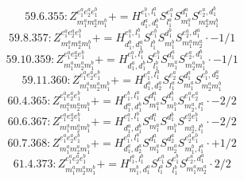 \documentclass[letterpaper,10pt,fleqn,leqno,onecolumn]{article}
\begin{document}
\begin{equation} \;\;\;\;\;\;  59.6.355: Z^{e_{1}^{a}e_{2}^{a}e_{1}^{b}}_{m_{1}^{a}m_{2}^{a}m_{1}^{b}}+=H^{e_{1}^{b},l_{1}^{a}}_{d_{1}^{a},d_{1}^{b}}S^{e_{1}^{a}}_{l_{1}^{a}}S^{d_{1}^{a}}_{m_{1}^{a}}S^{e_{2}^{a},d_{1}^{b}}_{m_{2}^{a}m_{1}^{b}} \end{equation}
\begin{equation} \;\;\;\;\;\;  59.8.357: Z^{e_{1}^{a}e_{2}^{a}e_{1}^{b}}_{m_{1}^{a}m_{2}^{a}m_{1}^{b}}+=H^{e_{1}^{a},l_{1}^{b}}_{d_{1}^{b},d_{1}^{a}}S^{e_{1}^{b}}_{l_{1}^{b}}S^{d_{1}^{b}}_{m_{1}^{b}}S^{e_{2}^{a},d_{1}^{a}}_{m_{1}^{a}m_{2}^{a}}\cdot -1/1 \end{equation}
\begin{equation} \;\;\;\;\;\;  59.10.359: Z^{e_{1}^{a}e_{2}^{a}e_{1}^{b}}_{m_{1}^{a}m_{2}^{a}m_{1}^{b}}+=H^{e_{1}^{a},l_{1}^{b}}_{d_{1}^{a},d_{1}^{b}}S^{e_{1}^{b}}_{l_{1}^{b}}S^{d_{1}^{a}}_{m_{1}^{a}}S^{e_{2}^{a},d_{1}^{b}}_{m_{2}^{a}m_{1}^{b}}\cdot -1/1 \end{equation}
\begin{equation} \;\;\;\;\;\;  59.11.360: Z^{e_{1}^{a}e_{2}^{a}e_{1}^{b}}_{m_{1}^{a}m_{2}^{a}m_{1}^{b}}+=H^{e_{1}^{a},l_{1}^{a}}_{d_{1}^{a},d_{2}^{a}}S^{e_{2}^{a}}_{l_{1}^{a}}S^{d_{1}^{a}}_{m_{1}^{a}}S^{e_{1}^{b},d_{2}^{a}}_{m_{2}^{a}m_{1}^{b}} \end{equation}
\begin{equation} \;\;\;\;\;\;  60.4.365: Z^{e_{1}^{a}e_{2}^{a}e_{1}^{b}}_{m_{1}^{a}m_{2}^{a}m_{1}^{b}}+=H^{e_{1}^{b},l_{1}^{a}}_{d_{1}^{a},d_{1}^{b}}S^{d_{1}^{a}}_{m_{1}^{a}}S^{d_{1}^{b}}_{m_{1}^{b}}S^{e_{1}^{a}e_{2}^{a}}_{m_{2}^{a},l_{1}^{a}}\cdot -2/2 \end{equation}
\begin{equation} \;\;\;\;\;\;  60.6.367: Z^{e_{1}^{a}e_{2}^{a}e_{1}^{b}}_{m_{1}^{a}m_{2}^{a}m_{1}^{b}}+=H^{e_{1}^{a},l_{1}^{b}}_{d_{1}^{a},d_{1}^{b}}S^{d_{1}^{a}}_{m_{1}^{a}}S^{d_{1}^{b}}_{m_{1}^{b}}S^{e_{2}^{a}e_{1}^{b}}_{m_{2}^{a},l_{1}^{b}}\cdot -2/2 \end{equation}
\begin{equation} \;\;\;\;\;\;  60.7.368: Z^{e_{1}^{a}e_{2}^{a}e_{1}^{b}}_{m_{1}^{a}m_{2}^{a}m_{1}^{b}}+=H^{e_{1}^{a},l_{1}^{a}}_{d_{1}^{a},d_{2}^{a}}S^{d_{1}^{a}}_{m_{1}^{a}}S^{d_{2}^{a}}_{m_{2}^{a}}S^{e_{2}^{a}e_{1}^{b}}_{m_{1}^{b},l_{1}^{a}}\cdot +1/2 \end{equation}
\begin{equation} \;\;\;\;\;\;  61.4.373: Z^{e_{1}^{a}e_{2}^{a}e_{1}^{b}}_{m_{1}^{a}m_{2}^{a}m_{1}^{b}}+=H^{l_{1}^{a},l_{1}^{b}}_{m_{1}^{b},d_{1}^{a}}S^{e_{1}^{a}}_{l_{1}^{a}}S^{e_{1}^{b}}_{l_{1}^{b}}S^{e_{2}^{a},d_{1}^{a}}_{m_{1}^{a}m_{2}^{a}}\cdot 2/2 \end{equation}
\end{document}
